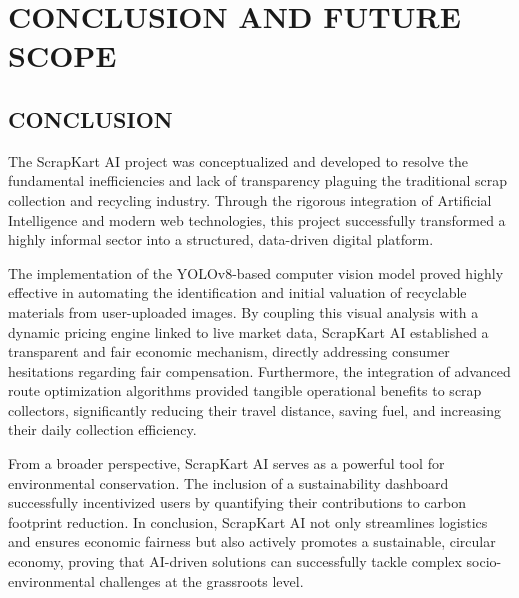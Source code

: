 \chapter{CONCLUSION AND FUTURE SCOPE}

\section{CONCLUSION}
The ScrapKart AI project was conceptualized and developed to resolve the fundamental inefficiencies and lack of transparency plaguing the traditional scrap collection and recycling industry. Through the rigorous integration of Artificial Intelligence and modern web technologies, this project successfully transformed a highly informal sector into a structured, data-driven digital platform. 

The implementation of the YOLOv8-based computer vision model proved highly effective in automating the identification and initial valuation of recyclable materials from user-uploaded images. By coupling this visual analysis with a dynamic pricing engine linked to live market data, ScrapKart AI established a transparent and fair economic mechanism, directly addressing consumer hesitations regarding fair compensation. Furthermore, the integration of advanced route optimization algorithms provided tangible operational benefits to scrap collectors, significantly reducing their travel distance, saving fuel, and increasing their daily collection efficiency. 

From a broader perspective, ScrapKart AI serves as a powerful tool for environmental conservation. The inclusion of a sustainability dashboard successfully incentivized users by quantifying their contributions to carbon footprint reduction. In conclusion, ScrapKart AI not only streamlines logistics and ensures economic fairness but also actively promotes a sustainable, circular economy, proving that AI-driven solutions can successfully tackle complex socio-environmental challenges at the grassroots level.

